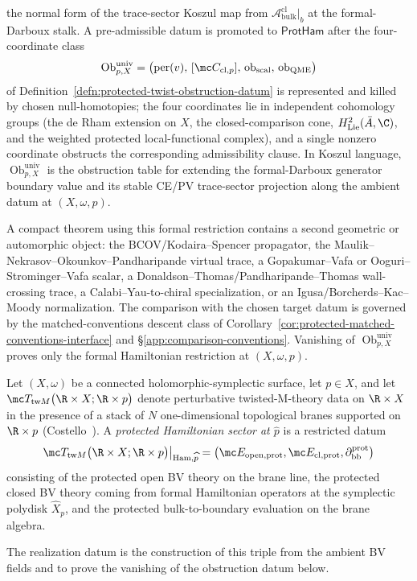 the normal form of the trace-sector Koszul map from
\(\mathcal A^{\mathrm{cl}}_{\mathrm{bulk}}|_b\) at the formal-Darboux stalk.  A
pre-admissible datum is promoted to \(\mathsf{ProtHam}\)
after the four-coordinate
class
\[
  \operatorname{Ob}^{\mathrm{univ}}_{p,X}
    =
  \bigl(\operatorname{per}(v),\,
        [\mc C_{\mathrm{cl},p}],\,
        \operatorname{ob}_{\mathrm{scal}},\,
        \operatorname{ob}_{\mathrm{QME}}\bigr)
\]
of Definition~\ref{defn:protected-twist-obstruction-datum} is
represented and killed by chosen null-homotopies; the four coordinates lie in independent
cohomology groups (the de Rham extension on \(X\), the
closed-comparison cone, \(H^2_{\mathrm{Lie}}(\bar A,\C)\), and the
weighted protected local-functional complex), and a single nonzero
coordinate obstructs the corresponding admissibility clause.  In
Koszul language, \(\operatorname{Ob}^{\mathrm{univ}}_{p,X}\) is the
obstruction table for extending the formal-Darboux generator boundary
value and its stable CE/PV trace-sector projection along the ambient datum
at \((X,\omega,p)\).

A compact theorem using this formal restriction contains a second
geometric or automorphic object: the BCOV/Kodaira--Spencer propagator,
the Maulik--Nekrasov--Okounkov--Pandharipande virtual trace, a
Gopakumar--Vafa or Ooguri--Strominger--Vafa scalar, a
Donaldson--Thomas/Pandharipande--Thomas wall-crossing trace, a
Calabi--Yau-to-chiral specialization, or an Igusa/Borcherds--Kac--Moody
normalization.  The comparison with the chosen target datum is governed by the
matched-conventions descent class of
Corollary~\ref{cor:protected-matched-conventions-interface} and
\S\ref{app:comparison-conventions}.  Vanishing of
\(\operatorname{Ob}^{\mathrm{univ}}_{p,X}\) proves only the formal
Hamiltonian restriction at \((X,\omega,p)\).

\begin{defn}\label{defn:protected-hamiltonian-sector-brane-point}
  Let $(X,\omega)$ be a connected holomorphic-symplectic surface, let
  $p\in X$, and let
  $\mc T_{\mathrm{tw}M}\bigl(\R\times X;\R\times p\bigr)$ denote
  perturbative twisted-M-theory data on $\R\times X$ in the presence
  of a stack of $N$ one-dimensional topological branes supported on
  $\R\times p$ (Costello~\cite{costello-twistedM}).  A
  \emph{protected Hamiltonian sector at $\widehat p$}
  is a restricted datum
  $$
  \mc T_{\mathrm{tw}M}\bigl(\R\times X;\R\times p\bigr)
    \big|_{\mathrm{Ham},\widehat p}
    =
    \bigl(
      \mc E_{\mathrm{open},\mathrm{prot}},
      \mc E_{\mathrm{cl},\mathrm{prot}},
      \partial_{\mathrm{bb}}^{\mathrm{prot}}
    \bigr)
  $$
  consisting of the protected open BV theory on the brane line, the
  protected closed BV theory coming from formal Hamiltonian operators
  at the symplectic polydisk $\widehat X_p$, and the protected
  bulk-to-boundary evaluation on the brane algebra.

  The realization datum is the construction of this triple from the ambient
  BV fields and to prove the vanishing of the obstruction datum below.
\end{defn}

